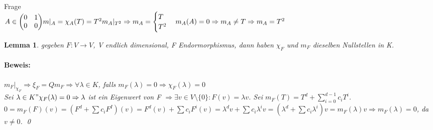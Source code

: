 \documentclass{report}
\newcommand{\lb}{\lambda}
\newcommand{\ve}[1]{{\begin{pmatrix}#1 \end{pmatrix}}}
\theoremstyle{customrem}
\theoremstyle{customdef}
\newtheorem{lemma}[definition]{Lemma}
\renewenvironment{proof}{\paragraph{Beweis: }}{\qed}
\theoremstyle{customenv}
\begin{document}
Frage\\
\(A \in \ve{0 & 1 \\ 0 & 0}
m|_A = \\
\chi_A(T) = T^2
m_A|_{T^2} \Rightarrow m_A = \begin{cases} T \\ T^2 \end{cases}
m_A(A) = 0 \Rightarrow m_A \neq T \Rightarrow m_A = T^2
\)

\begin{lemma}
  gegeben \(F : V \to V\), V endlich dimensional, F Endormorphismus, dann haben
  \(\chi_F\) und \(m_F\) dieselben Nullstellen in K.
  \begin{proof}
    \(m_F|_{\chi_F} \Rightarrow \xi_F = Q m_F \Rightarrow \forall \lb \in K\),
    falls \(m_F(\lb) = 0 \Rightarrow \chi_F(\lb) = 0\)\\
    Sei \(\lb \in K " \chi_F(\lb) = 0 \Rightarrow \lb \) ist ein Eigenwert von F
    \(\Rightarrow \exists v \in V \setminus \{0\} : F(v) = \lb v\). Sei \(m_F(T)
    = T^d + \sum_{i=0}^{d-1} c_i T^i\). \(0 = m_F(F)(v) = (F^d + \sum c_iF^I)(v)
    = F^d(v) + \sum c_i F^i(v)
    = \lb^d v + \sum c_i \lb^i v
    = (\lb^d + \sum c_i \lb^i) v
    = m_F(\lb) v
    \Rightarrow m_F(\lb) = 0\), da \(v \neq 0\).
  \end{proof}
\end{lemma}
\end{document}

